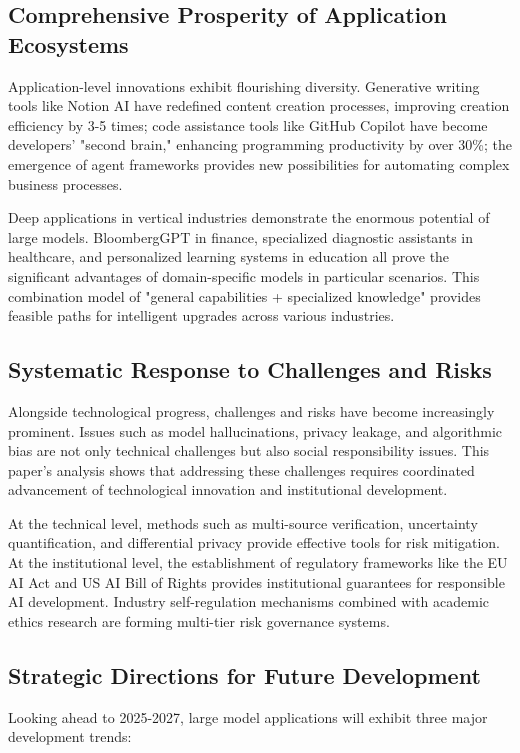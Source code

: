 \documentclass{article}
\begin{document}
\subsection{Comprehensive Prosperity of Application Ecosystems}
Application-level innovations exhibit flourishing diversity. Generative writing tools like Notion AI have redefined content creation processes, improving creation efficiency by 3-5 times; code assistance tools like GitHub Copilot have become developers' "second brain," enhancing programming productivity by over 30\%; the emergence of agent frameworks provides new possibilities for automating complex business processes.

Deep applications in vertical industries demonstrate the enormous potential of large models. BloombergGPT in finance, specialized diagnostic assistants in healthcare, and personalized learning systems in education all prove the significant advantages of domain-specific models in particular scenarios. This combination model of "general capabilities + specialized knowledge" provides feasible paths for intelligent upgrades across various industries.

\subsection{Systematic Response to Challenges and Risks}
Alongside technological progress, challenges and risks have become increasingly prominent. Issues such as model hallucinations, privacy leakage, and algorithmic bias are not only technical challenges but also social responsibility issues. This paper's analysis shows that addressing these challenges requires coordinated advancement of technological innovation and institutional development.

At the technical level, methods such as multi-source verification, uncertainty quantification, and differential privacy provide effective tools for risk mitigation. At the institutional level, the establishment of regulatory frameworks like the EU AI Act and US AI Bill of Rights provides institutional guarantees for responsible AI development. Industry self-regulation mechanisms combined with academic ethics research are forming multi-tier risk governance systems.

\subsection{Strategic Directions for Future Development}
Looking ahead to 2025-2027, large model applications will exhibit three major development trends:
\end{document}
